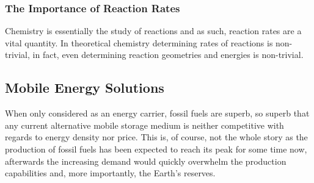 \subsubsection{The Importance of Reaction Rates}
Chemistry is essentially the study of reactions and as such, reaction rates are a vital quantity.
In theoretical chemistry determining rates of reactions is non-trivial, in fact, even determining reaction geometries and energies is non-trivial.

\subsection{Mobile Energy Solutions}
When only considered as an energy carrier, fossil fuels are superb, so superb that any current alternative mobile storage medium is neither competitive with regards to energy density nor price.
This is, of course, not the whole story as the production of fossil fuels has been expected to reach its peak for some time now, afterwards the increasing demand would quickly overwhelm the production capabilities and, more importantly, the Earth's reserves.





